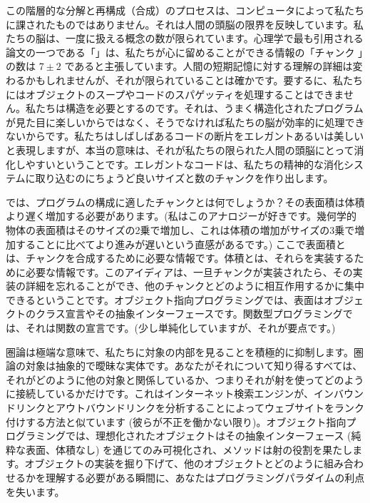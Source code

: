 この階層的な分解と再構成（合成）のプロセスは、コンピュータによって私たちに課されたものではありません。それは人間の頭脳の限界を反映しています。私たちの脳は、一度に扱える概念の数が限られています。心理学で最も引用される論文の一つである「」は、私たちが心に留めることができる情報の「チャンク 」の数は $7 \pm 2$ であると主張しています。人間の短期記憶に対する理解の詳細は変わるかもしれませんが、それが限られていることは確かです。要するに、私たちにはオブジェクトのスープやコードのスパゲッティを処理することはできません。私たちは構造を必要とするのです。それは、うまく構造化されたプログラムが見た目に楽しいからではなく、そうでなければ私たちの脳が効率的に処理できないからです。私たちはしばしばあるコードの断片をエレガントあるいは美しいと表現しますが、本当の意味は、それが私たちの限られた人間の頭脳にとって消化しやすいということです。エレガントなコードは、私たちの精神的な消化システムに取り込むのにちょうど良いサイズと数のチャンクを作り出します。

では、プログラムの構成に適したチャンクとは何でしょうか？その表面積は体積より遅く増加する必要があります。(私はこのアナロジーが好きです。幾何学的物体の表面積はそのサイズの2乗で増加し、これは体積の増加がサイズの3乗で増加することに比べてより進みが遅いという直感があるです。) ここで表面積とは、チャンクを合成するために必要な情報です。体積とは、それらを実装するために必要な情報です。このアイディアは、一旦チャンクが実装されたら、その実装の詳細を忘れることができ、他のチャンクとどのように相互作用するかに集中できるということです。オブジェクト指向プログラミングでは、表面はオブジェクトのクラス宣言やその抽象インターフェースです。関数型プログラミングでは、それは関数の宣言です。(少し単純化していますが、それが要点です。) 

圏論は極端な意味で、私たちに対象の内部を見ることを積極的に抑制します。圏論の対象は抽象的で曖昧な実体です。あなたがそれについて知り得るすべては、それがどのように他の対象と関係しているか、つまりそれが射を使ってどのように接続しているかだけです。これはインターネット検索エンジンが、インバウンドリンクとアウトバウンドリンクを分析することによってウェブサイトをランク付けする方法と似ています (彼らが不正を働かない限り)。オブジェクト指向プログラミングでは、理想化されたオブジェクトはその抽象インターフェース (純粋な表面、体積なし) を通じてのみ可視化され、メソッドは射の役割を果たします。オブジェクトの実装を掘り下げて、他のオブジェクトとどのように組み合わせるかを理解する必要がある瞬間に、あなたはプログラミングパラダイムの利点を失います。

